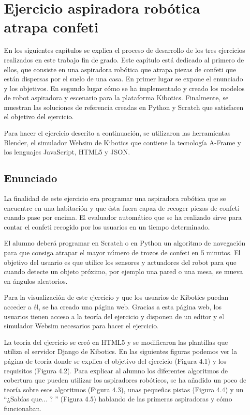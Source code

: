 \chapter{Ejercicio aspiradora robótica atrapa confeti}\label{chap:aspiradora}
En los siguientes capítulos se explica el proceso de desarrollo de los tres ejercicios realizados en este trabajo fin de grado. Este capítulo está dedicado al primero de ellos, que consiste en una aspiradora robótica que atrapa piezas de confeti que están dispersas por el suelo de una casa. En primer lugar se expone el enunciado y los objetivos. En segundo lugar cómo se ha implementado y creado los modelos de robot aspiradora y escenario para la plataforma Kibotics. Finalmente, se muestran las soluciones de referencia creadas en Python y Scratch que satisfacen el objetivo del ejercicio.

Para hacer el ejercicio descrito a continuación, se utilizaron las herramientas Blender, el simulador Websim de Kibotics que contiene la tecnología A-Frame y los lenguajes JavaScript, HTML5 y JSON.

\section{Enunciado}
La finalidad de este ejercicio era programar una aspiradora robótica que se encuentre en una habitación y que ésta fuera capaz de recoger piezas de confeti cuando pase por encima. El evaluador automático que se ha realizado sirve para contar el confeti recogido por los usuarios en un tiempo determinado.

El alumno deberá programar en Scratch o en Python un algoritmo de navegación para que consiga atrapar el mayor número de trozos de confeti en 5 minutos. El objetivo del usuario es que utilice los sensores y actuadores del robot para que cuando detecte un objeto próximo, por ejemplo una pared o una mesa, se mueva en ángulos aleatorios. 

Para la visualización de este ejercicio y que los usuarios de Kibotics puedan acceder a él, se ha creado una página web. Gracias a esta página web, los usuarios tienen acceso a la teoría del ejercicio y  disponen de un editor y el simulador Websim necesarios para hacer el ejercicio. 

La teoría del ejercicio se creó en HTML5 y se modificaron las plantillas que utiliza el servidor Django de Kibotics.
En las siguientes figuras podemos ver la página de teoría donde se explica el objetivo del ejercicio (Figura 4.1) y los requisitos (Figura 4.2). Para explicar al alumno los diferentes algoritmos de cobertura que pueden utilizar los aspiradores robóticos, se ha añadido un poco de teoría sobre esos algoritmos (Figura  4.3), unas pequeñas pistas (Figura 4.4) y un ``¿Sabías que... ? '' (Figura 4.5) hablando de las primeras aspiradoras y cómo funcionaban. 
\\

